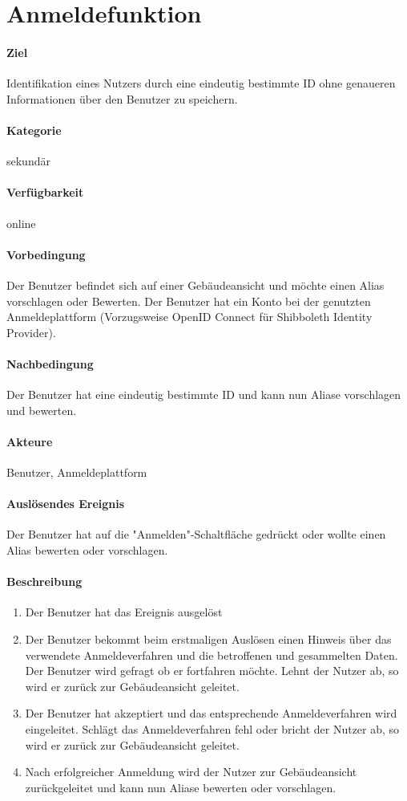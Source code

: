\section{Anmeldefunktion}
\label{Anmeldefunktion}
\paragraph{Ziel}
Identifikation eines Nutzers durch eine eindeutig bestimmte ID ohne genaueren Informationen über den Benutzer zu speichern.
\paragraph{Kategorie}
sekundär
\paragraph{Verfügbarkeit}
online
\paragraph{Vorbedingung}
Der Benutzer befindet sich auf einer Gebäudeansicht und möchte einen Alias vorschlagen oder Bewerten.
Der Benutzer hat ein Konto bei der genutzten Anmeldeplattform (Vorzugsweise OpenID Connect für Shibboleth Identity Provider).
\paragraph{Nachbedingung}
Der Benutzer hat eine eindeutig bestimmte ID und kann nun Aliase vorschlagen und bewerten.
\paragraph{Akteure}
Benutzer, Anmeldeplattform
\paragraph{Auslösendes Ereignis}
Der Benutzer hat auf die "Anmelden"-Schaltfläche gedrückt oder wollte einen Alias bewerten oder vorschlagen.
\paragraph{Beschreibung}
\begin{enumerate}
    \item Der Benutzer hat das Ereignis ausgelöst
    \item Der Benutzer bekommt beim erstmaligen Auslösen einen Hinweis über das verwendete Anmeldeverfahren und die betroffenen und gesammelten Daten.
          Der Benutzer wird gefragt ob er fortfahren möchte.
          \subitem Lehnt der Nutzer ab, so wird er zurück zur Gebäudeansicht geleitet.
    \item Der Benutzer hat akzeptiert und das entsprechende Anmeldeverfahren wird eingeleitet.
          \subitem Schlägt das Anmeldeverfahren fehl oder bricht der Nutzer ab, so wird er zurück zur Gebäudeansicht geleitet.
    \item Nach erfolgreicher Anmeldung wird der Nutzer zur Gebäudeansicht zurückgeleitet und kann nun Aliase bewerten oder vorschlagen.
\end{enumerate}